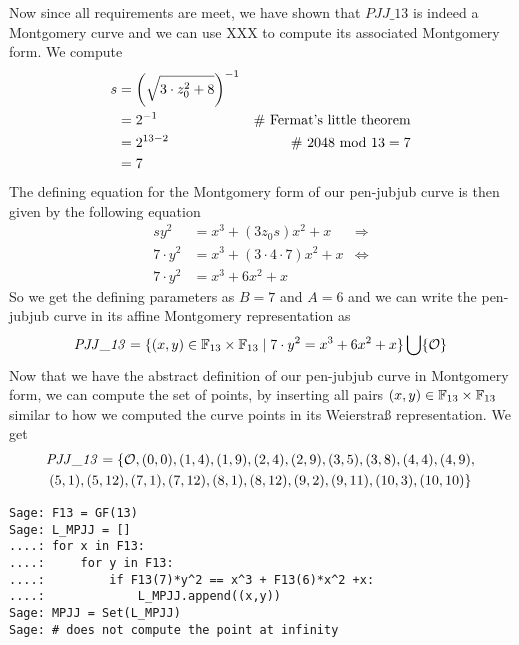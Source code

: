 \begin{example}
Now since all requirements are meet, we have shown that $\mathit{PJJ\_13}$ is indeed a Montgomery curve and we can use XXX to compute its associated Montgomery form. We compute
\begin{align*}
s & = \left(\sqrt{3\cdot z_0^2 +8}\right)^{-1} \\
  & = 2^{-1} & \text{\# Fermat's little theorem} \\
  & = 2^{13-2} & \text{\# }2048 \text{ mod } 13 = 7\\
  & = 7
\end{align*}
The defining equation for the Montgomery form of our pen-jubjub curve is then given by the following equation
\begin{align*}
sy^{2} & =x^{3}+(3z_0 s)x^{2}+x  & \Rightarrow\\
7\cdot y^{2} & =x^{3}+(3\cdot 4 \cdot 7)x^{2}+x &\Leftrightarrow\\
7\cdot y^{2} & =x^{3}+6x^{2}+x
\end{align*}
So we get the defining parameters as $B= 7$ and $A=6$ and we can write the pen-jubjub curve in its affine Montgomery representation as
$$
\mathit{PJJ\_13} = \{(x,y)\in \mathbb{F}_{13}\times \mathbb{F}_{13}\;|\; 7\cdot y^{2} =x^{3}+6x^{2}+x \}\bigcup \{\mathcal{O}\}
$$ 
Now that we have the abstract definition of our pen-jubjub curve in Montgomery form, we can compute the set of points, by inserting all pairs $(x,y)\in\mathbb{F}_{13}\times \mathbb{F}_{13}$ similar to how we computed the curve points in its Weierstraß representation. We get
\begin{multline*}
\mathit{PJJ\_13} = \{\mathcal{O}, (0, 0),(1, 4),(1, 9),(2, 4),(2, 9),(3, 5),(3, 8),(4, 4),(4, 9),\\ (5, 1),(5, 12),(7, 1),(7, 12),(8, 1),(8, 12),(9, 2),(9, 11),(10, 3),(10, 10)\}
\end{multline*}
\begin{verbatim}
Sage: F13 = GF(13)
Sage: L_MPJJ = []
....: for x in F13:
....:     for y in F13:
....:         if F13(7)*y^2 == x^3 + F13(6)*x^2 +x:
....:             L_MPJJ.append((x,y))
Sage: MPJJ = Set(L_MPJJ)
Sage: # does not compute the point at infinity
\end{verbatim}
\end{example}
